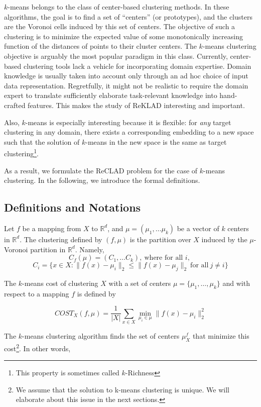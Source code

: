 \documentclass[letterpaper,12pt,titlepage,oneside,final]{book}
\begin{document}
$k$-means belongs to the class of center-based clustering methods. In these algorithms, the goal is to find a set of ``centers'' (or prototypes), and the clusters are the Voronoi cells induced by this set of centers. The objective of such a clustering is to minimize the expected value of some monotonically increasing function of the distances of points to their cluster centers. The $k$-means clustering objective is arguably the most popular paradigm in this class. Currently, center-based clustering tools lack a vehicle for incorporating domain expertise. Domain knowledge is usually taken into account only through an ad hoc choice of input data representation. Regretfully, it might not be realistic to require the domain expert to translate sufficiently elaborate task-relevant knowledge into hand-crafted features. This makes the study of ReKLAD interesting and important.

Also, $k$-means is especially interesting because it is flexible: for \emph{any} target clustering in any domain, there exists a corresponding embedding to a new space such that the solution of $k$-means in the new space is the same as target clustering\footnote{This property is sometimes called $k$-Richness}.

As a result, we formulate the ReCLAD problem for the case of $k$-means clustering. In the following, we introduce the formal definitions.

\subsection{Definitions and Notations}

Let $f$ be a mapping from $X$ to $\mathbb{R}^{d}$, and $\mu=(\mu_1, \ldots \mu_k)$ be a vector of $k$ centers in $\mathbb{R}^d$. The clustering defined by $(f, \mu)$ is the partition over $X$ induced by the $\mu$-Voronoi partition in $\mathbb{R}^d$. Namely,
\[C_f(\mu)=(C_1, \ldots C_k), ~\mbox{where for all $i$}, ~ \]\[C_i=\{x\in X: \|f(x)-\mu_i\|_2 \leq \|f(x)-\mu_j\|_2 ~\mbox{for all} ~ j\neq i \}\]

The $k$-means cost of clustering $X$ with a set of centers $\mu=\{\mu_1,\ldots,\mu_k\}$ and with respect to a mapping $f$ is defined by

\begin{equation}
COST_{X}(f, \mu) = \frac{1}{|X|} \sum_{x \in X} \min_{\mu_i \in \mu} \|f(x)-\mu_i\|_2^2
\end{equation}

The $k$-means clustering algorithm finds the set of centers $\mu^f_{X}$ that minimize this cost\footnote{We assume that the solution to k-means clustering is unique. We will elaborate about this issue in the next sections.}. In other words,
\end{document}
